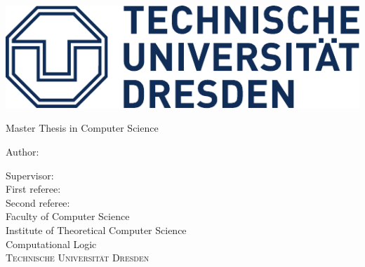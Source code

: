 \noindent\centering%
\makeatletter%
\includegraphics{res/TUD-blue.pdf}

\vspace{5ex}%
\noindent%
\LARGE%
\textsf{Master Thesis in Computer Science}

\vspace{10ex}%
\noindent%
\begin{OnehalfSpace}%
  {\textsf{\Huge\@title}}
\end{OnehalfSpace}

\vspace{5ex}
\noindent
Author: \@author\\

\vfill
\noindent
\raggedright
Supervisor: \supervisor\\
First referee: \\
Second referee: \\

\Large
\vspace{5ex}
\noindent
Faculty of Computer Science\\
Institute of Theoretical Computer Science\\
Computational Logic\\
\textsc{Technische Universität Dresden}\\[4ex]
\@date
\normalsize
\makeatother
